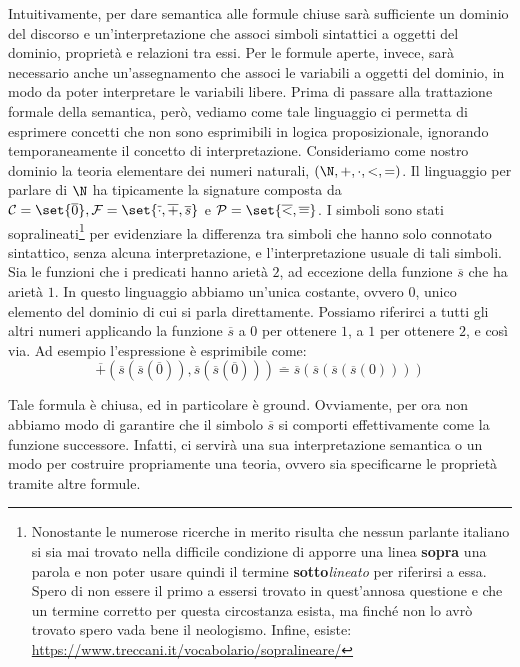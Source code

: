 Intuitivamente, per dare semantica alle formule chiuse sarà sufficiente un dominio del discorso e un'interpretazione che associ simboli sintattici a oggetti del dominio, proprietà e relazioni tra essi. Per le formule aperte, invece, sarà necessario anche un'assegnamento che associ le variabili a oggetti del dominio, in modo da poter interpretare le variabili libere. Prima di passare alla trattazione formale della semantica, però, vediamo come tale linguaggio ci permetta di esprimere concetti che non sono esprimibili in logica proposizionale, ignorando temporaneamente il concetto di interpretazione. Consideriamo come nostro dominio la teoria elementare dei numeri naturali, \((\N,+,\cdot,<,=)\).
Il linguaggio per parlare di \(\N\) ha tipicamente la signature composta da \(\ConstSyms = \set{\overline{0}}, \FuncSyms=\set{\overline{\cdot}, \overline{+}, \overline{s}}\) e \(\PredSyms = \set{\overline{<}, \overline{=}}\). I simboli sono stati sopralineati\footnote{Nonostante le numerose ricerche in merito risulta che nessun parlante italiano si sia mai trovato nella difficile condizione di apporre una linea \textbf{sopra} una parola e non poter usare quindi il termine \textbf{sotto}\textit{lineato} per riferirsi a essa. Spero di non essere il primo a essersi trovato in quest'annosa questione e che un termine corretto per questa circostanza esista, ma finché non lo avrò trovato spero vada bene il neologismo. Infine, esiste: \url{https://www.treccani.it/vocabolario/sopralineare/}} per evidenziare la differenza tra simboli che hanno solo connotato sintattico, senza alcuna interpretazione, e l'interpretazione usuale di tali simboli. Sia le funzioni che i predicati hanno arietà \(2\), ad eccezione della funzione \(\overline{s}\) che ha arietà \(1\). In questo linguaggio abbiamo un'unica costante, ovvero \(0\), unico elemento del dominio di cui si parla direttamente. Possiamo riferirci a tutti gli altri numeri applicando la funzione \(\overline{s}\) a \(0\) per ottenere \(1\), a \(1\) per ottenere \(2\), e così via. Ad esempio l'espressione  è esprimibile come:
\[\overline{+}(\overline{s}(\overline{s}(\overline{0})), \overline{s}(\overline{s}(\overline{0})))\overline{=} \overline{s}(\overline{s}(\overline{s}(\overline{s}(0))))\]


Tale formula è chiusa, ed in particolare è ground.
Ovviamente, per ora non abbiamo modo di garantire che il simbolo \(\overline{s}\) si comporti effettivamente come la funzione successore. Infatti, ci servirà una sua interpretazione semantica o un modo per costruire propriamente una teoria, ovvero sia specificarne le proprietà tramite altre formule.

